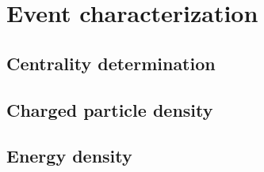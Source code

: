 \section{Event characterization}
\label{secks:eventchar}
\subsection{Centrality determination}
\label{subsecks:centrality}
\subsection{Charged particle density}
\label{subsecks:partdensity}
\subsection{Energy density}
\label{subsecks:energydensity}
